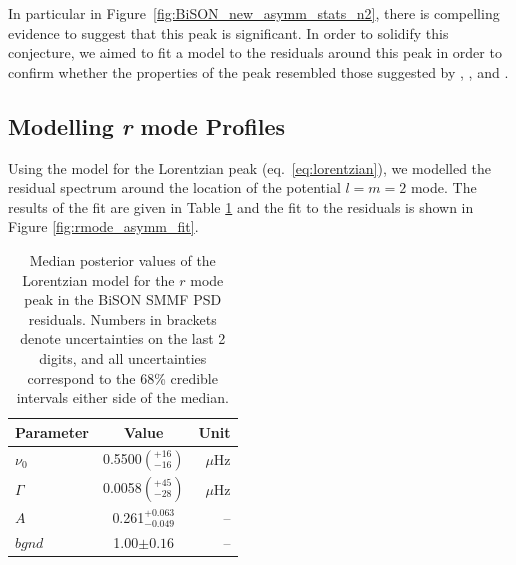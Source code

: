 In particular in Figure~\ref{fig:BiSON_new_asymm_stats_n2}, there is compelling evidence to suggest that this peak is significant. In order to solidify this conjecture, we aimed to fit a model to the residuals around this peak in order to confirm whether the properties of the peak resembled those suggested by \citet{loptien_global-scale_2018}, \citet{liang_time-distance_2019}, and \citet{lanza_sectoral_2019}.


\subsection{Modelling {\it r} mode Profiles}

Using the model for the Lorentzian peak (eq.~\ref{eq:lorentzian}), we modelled the residual spectrum around the location of the potential  $l=m=2$ mode. The results of the fit are given in Table \ref{tab:rmode_fit_params} and the fit to the residuals is shown in Figure \ref{fig:rmode_asymm_fit}.

\begin{table}[!ht]
	\begin{center}
		\caption{Median posterior values of the Lorentzian model for the $r$ mode peak in the BiSON SMMF PSD residuals. Numbers in brackets denote uncertainties on the last 2 digits, and all uncertainties correspond to the 68\% credible intervals either side of the median.}
		\label{tab:rmode_fit_params}
		\begin{tabular}{l c r}
			\hline
			{Parameter} & {Value} & {Unit} \\
			\hline
			
			{$\nu_0$} & {0.5500$\left(_{-16}^{+16}\right)$} & {$\mu\mathrm{Hz} $}\\
			
			{$\Gamma$} & {0.0058$\left(_{-28}^{+45}\right)$} & {$\mu\mathrm{Hz} $} \\
			
			{$A$} & {0.261$_{-0.049}^{+0.063}$} & {--} \\
			
			
			{$bgnd$} & {1.00$\pm 0.16$} & {--} \\	
			
			\hline
		\end{tabular}
	\end{center}
\end{table}

